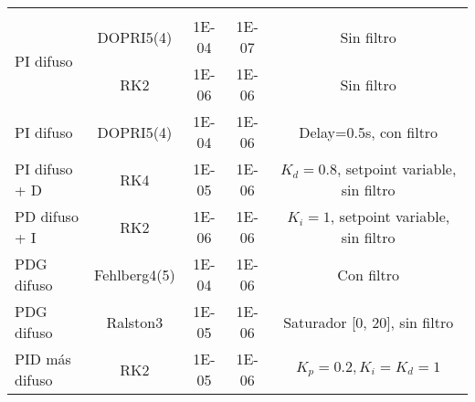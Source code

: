 {\begin{longtable}{l @{\extracolsep{\fill}} cccc}
                                        &              &             &             &                                           \\[-3pt]  
            \multirow{2}{*}{PI difuso}  & DOPRI5(4)    & \num{1E-04} & \num{1E-07} & Sin filtro                                \\
                                        & RK2          & \num{1E-06} & \num{1E-06} & Sin filtro                                \\
            PI difuso                   & DOPRI5(4)    & \num{1E-04} & \num{1E-06} & Delay=0.5s, con filtro                    \\
            PI difuso + D               & RK4          & \num{1E-05} & \num{1E-06} & $K_d=0.8$, setpoint variable, sin filtro  \\
            PD difuso + I               & RK2          & \num{1E-06} & \num{1E-06} & $K_i=1$, setpoint variable, sin filtro    \\
            PDG difuso                  & Fehlberg4(5) & \num{1E-04} & \num{1E-06} & Con filtro                                \\
            PDG difuso                  & Ralston3     & \num{1E-05} & \num{1E-06} & Saturador [0, 20], sin filtro             \\
            PID más difuso              & RK2          & \num{1E-05} & \num{1E-06} & $K_p=0.2, K_i=K_d=1$                      \\
        \end{longtable}}

